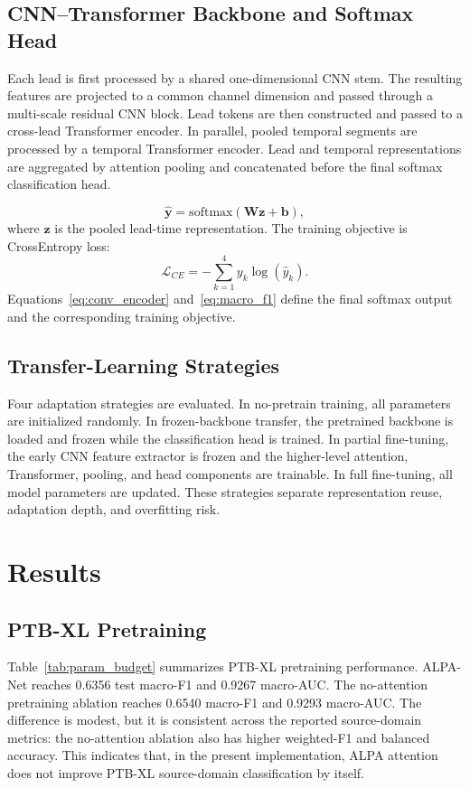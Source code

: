 \documentclass[a4paper,fleqn]{cas-dc}
\begin{document}
\subsection{CNN--Transformer Backbone and Softmax Head}
Each lead is first processed by a shared one-dimensional CNN stem. The resulting features are
projected to a common channel dimension and passed through a multi-scale residual CNN block. Lead
tokens are then constructed and passed to a cross-lead Transformer encoder. In parallel, pooled
temporal segments are processed by a temporal Transformer encoder. Lead and temporal representations
are aggregated by attention pooling and concatenated before the final softmax classification head.

\begin{equation}
\hat{\mathbf{y}}=\mathrm{softmax}(\mathbf{W}\mathbf{z}+\mathbf{b}),
\label{eq:conv_encoder}
\end{equation}
where $\mathbf{z}$ is the pooled lead-time representation. The training objective is CrossEntropy
loss:
\begin{equation}
\mathcal{L}_{CE}=-\sum_{k=1}^{4} y_k\log(\hat{y}_k).
\label{eq:macro_f1}
\end{equation}
Equations~\ref{eq:conv_encoder} and~\ref{eq:macro_f1} define the final softmax output and the
corresponding training objective.

\subsection{Transfer-Learning Strategies}
Four adaptation strategies are evaluated. In no-pretrain training, all parameters are initialized
randomly. In frozen-backbone transfer, the pretrained backbone is loaded and frozen while the
classification head is trained. In partial fine-tuning, the early CNN feature extractor is frozen
and the higher-level attention, Transformer, pooling, and head components are trainable. In full
fine-tuning, all model parameters are updated. These strategies separate representation reuse,
adaptation depth, and overfitting risk.

\section{Results}
\subsection{PTB-XL Pretraining}
Table~\ref{tab:param_budget} summarizes PTB-XL pretraining performance. ALPA-Net reaches 0.6356 test
macro-F1 and 0.9267 macro-AUC. The no-attention pretraining ablation reaches 0.6540 macro-F1 and
0.9293 macro-AUC. The difference is modest, but it is consistent across the reported source-domain
metrics: the no-attention ablation also has higher weighted-F1 and balanced accuracy. This indicates
that, in the present implementation, ALPA attention does not improve PTB-XL source-domain
classification by itself.
\end{document}

